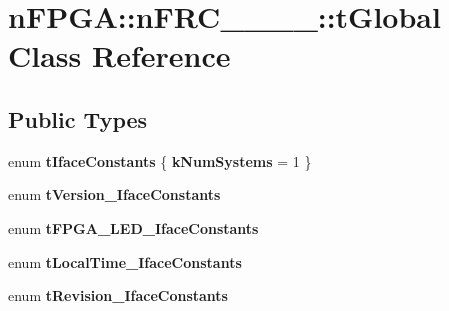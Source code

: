 \hypertarget{classnFPGA_1_1nFRC__2012__1__6__4_1_1tGlobal}{
\section{nFPGA::nFRC\_\_\_\_::tGlobal Class Reference}
\label{classnFPGA_1_1nFRC__2012__1__6__4_1_1tGlobal}
}
\subsection*{Public Types}
\begin{DoxyCompactItemize}
\item 
enum {\bfseries tIfaceConstants} \{ {\bfseries kNumSystems} =  1
 \}
\item 
enum {\bfseries tVersion\_\-IfaceConstants} 
\item 
enum {\bfseries tFPGA\_\-LED\_\-IfaceConstants} 
\item 
enum {\bfseries tLocalTime\_\-IfaceConstants} 
\item 
enum {\bfseries tRevision\_\-IfaceConstants} 
\end{DoxyCompactItemize}
